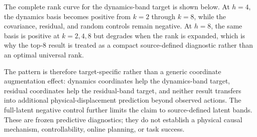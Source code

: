 \documentclass{article}
\begin{document}
The complete rank curve for the dynamics-band target is shown below. At
$h=4$, the dynamics basis becomes positive from $k=2$ through $k=8$, while
the covariance, residual, and random controls remain negative. At $h=8$,
the same basis is positive at $k=2,4,8$ but degrades when the rank is
expanded, which is why the top-8 result is treated as a compact
source-defined diagnostic rather than an optimal universal rank.

\begin{table}[H]
\centering
\scriptsize
\setlength{\tabcolsep}{3pt}
\caption{Complete rank curve for the dynamics-band latent target. Cells are mean paired incremental $R^2$ over the observed-action baseline; the ranks were fixed before evaluating the target-specific contrasts.}
\label{tab:supp-rank-curve}
\end{table}

The pattern is therefore target-specific rather than a generic coordinate
augmentation effect: dynamics coordinates help the dynamics-band target,
residual coordinates help the residual-band target, and neither result
transfers into additional physical-displacement prediction beyond observed
actions. The full-latent negative control further limits the claim to
source-defined latent bands. These are frozen predictive diagnostics; they do
not establish a physical causal mechanism, controllability, online planning,
or task success.
\end{document}
